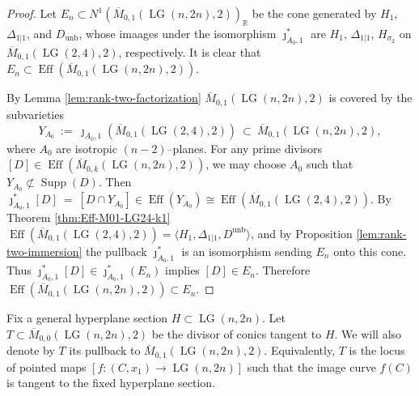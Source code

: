 \documentclass[10pt]{amsart}
\theoremstyle{definition}
\newcommand{\Eff}{\operatorname{Eff}}
\newcommand{\LG}{\operatorname{LG}}
\DeclareMathOperator{\Supp}{Supp}
\DeclareMathOperator{\unb}{unb}
\theoremstyle{plain} %
\begin{document}
\begin{proof}
Let $E_n\subset N^1(\overline{M}_{0,1}(\LG(n,2n),2))_{\mathbb{R}}$ be the cone generated by $H_1$, $\Delta_{1|1}$, and $D_{\unb}$, whose imaages under the isomorphism $\jmath_{A_0,1}^*$ are $H_1$, $\Delta_{1|1}$, $H_{\sigma_2}$ on $\overline{M}_{0,1}(\LG(2,4),2)$, respectively. It is clear that $E_n\subset \Eff(\overline{M}_{0,1}(\LG(n,2n),2))$. 

By Lemma \ref{lem:rank-two-factorization} $\overline{M}_{0,1}(\LG(n,2n),2)$ is covered by the subvarieties
\[
Y_{A_0}\ :=\ \jmath_{A_0,1}(\overline{M}_{0,1}(\LG(2,4),2))\ \subset\ \overline{M}_{0,1}(\LG(n,2n),2),
\]
where $A_0$ are isotropic $(n-2)$--planes.
For any prime divisors $[D]\in \Eff(\overline{M}_{0,k}(\LG(n,2n),2))$, we may choose $A_0$ such that $Y_{A_0}\not\subset \Supp(D)$.
Then $\jmath_{A_0,1}^*[D]\ =\ [D\cap Y_{A_0}]\in \Eff(Y_{A_0}) \cong\Eff(\overline{M}_{0,1}(\LG(2,4),2))$. By Theorem \ref{thm:Eff-M01-LG24-k1} $\Eff(\overline{M}_{0,1}(\LG(2,4),2)) =\bigl\langle H_1,\Delta_{1|1},D^{\mathrm{unb}}\bigr\rangle$, and by Proposition \ref{lem:rank-two-immersion}  the pullback $\jmath_{A_0,1}^*$ is an isomorphism sending $E_n$ onto this cone.
Thus $\jmath_{A_0,1}^*[D]\in \jmath_{A_0,1}^*(E_n)$ implies $[D]\in E_n$. Therefore $\Eff(\overline{M}_{0,1}(\LG(n,2n),2))\subset E_n$.
\end{proof}




Fix a general hyperplane section $H\subset \LG(n,2n)$. Let $T\subset \overline{M}_{0,0}(\LG(n,2n),2)$ be the divisor of conics tangent to $H$. We will also denote by $T$ its pullback to $\overline{M}_{0,1}(\LG(n,2n),2)$. Equivalently, $T$ is the locus of pointed maps $[f\colon(C,x_1)\to \LG(n,2n)]$ such that the image curve
$f(C)$ is tangent to the fixed hyperplane section.
\end{document}
